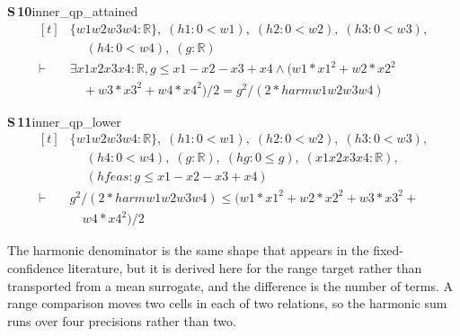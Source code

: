 \documentclass[conference]{IEEEtran}
\theoremstyle{definition}
\newcommand{\lean}[1]{\textsf{\footnotesize #1}}
\begin{document}
\noindent\textbf{S\,10}\quad\lean{inner\_qp\_attained}
{\footnotesize\[ \begin{aligned}[t]
&\{ \mathit{w1} \mathit{w2} \mathit{w3} \mathit{w4} : \mathbb{R} \},\; (\mathit{h1} : 0 < \mathit{w1}),\; (\mathit{h2} : 0 < \mathit{w2}),\; (\mathit{h3} : 0 < \mathit{w3}),\\
&\quad \; (\mathit{h4} : 0 < \mathit{w4}),\; (\mathit{g} : \mathbb{R} )\\
\vdash\;&\exists \mathit{x1} \mathit{x2} \mathit{x3} \mathit{x4} : \mathbb{R} , \mathit{g} \leq \mathit{x1} - \mathit{x2} - \mathit{x3} + \mathit{x4} \wedge (\mathit{w1}*\mathit{x1}^{2} + \mathit{w2}*\mathit{x2}^{2}\\
&\quad + \mathit{w3}*\mathit{x3}^{2} + \mathit{w4}*\mathit{x4}^{2}) / 2 = \mathit{g} ^{2} / (2 * \mathit{harm} \mathit{w1} \mathit{w2} \mathit{w3} \mathit{w4})
\end{aligned} \]}

\noindent\textbf{S\,11}\quad\lean{inner\_qp\_lower}
{\footnotesize\[ \begin{aligned}[t]
&\{ \mathit{w1} \mathit{w2} \mathit{w3} \mathit{w4} : \mathbb{R} \},\; (\mathit{h1} : 0 < \mathit{w1}),\; (\mathit{h2} : 0 < \mathit{w2}),\; (\mathit{h3} : 0 < \mathit{w3}),\\
&\quad \; (\mathit{h4} : 0 < \mathit{w4}),\; (\mathit{g} : \mathbb{R} ),\; (\mathit{hg} : 0 \leq \mathit{g}),\; (\mathit{x1} \mathit{x2} \mathit{x3} \mathit{x4} : \mathbb{R} ),\\
&\quad \; (\mathit{hfeas} : \mathit{g} \leq \mathit{x1} - \mathit{x2} - \mathit{x3} + \mathit{x4})\\
\vdash\;&\mathit{g} ^{2} / (2 * \mathit{harm} \mathit{w1} \mathit{w2} \mathit{w3} \mathit{w4}) \leq (\mathit{w1}*\mathit{x1}^{2} + \mathit{w2}*\mathit{x2}^{2} + \mathit{w3}*\mathit{x3}^{2} +\\
&\quad \mathit{w4}*\mathit{x4}^{2}) / 2
\end{aligned} \]}


The harmonic denominator is the same shape that appears in the fixed-confidence literature,
but it is derived here for the range target rather than transported from a mean surrogate,
and the difference is the number of terms. A range comparison moves two cells in each of two
relations, so the harmonic sum runs over four precisions rather than two.
\end{document}
